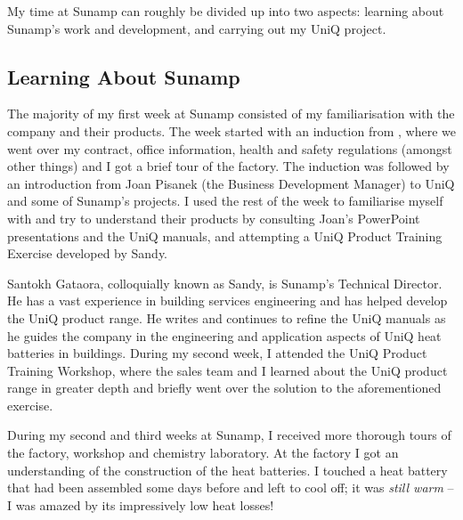 My time at Sunamp can roughly be divided up into two aspects: learning about Sunamp's work and development, and
carrying out my UniQ project.





\subsection{Learning About Sunamp}

The majority of my first week at Sunamp consisted of my familiarisation with the company and their products.
The week started with an induction from , where we went over my contract, office information, health and safety regulations (amongst other things) and I got a brief tour of the factory.
The induction was followed by an introduction from Joan Pisanek (the Business Development Manager) to UniQ and some of Sunamp's projects.
I used the rest of the week to familiarise myself with and try to understand their products by consulting Joan's PowerPoint presentations and the UniQ manuals,
and attempting a UniQ Product Training Exercise developed by Sandy.

Santokh Gataora, colloquially known as Sandy, is Sunamp's Technical Director.
He has a vast experience in building services engineering and has helped develop the UniQ product range.
He writes and continues to refine the UniQ manuals as he guides the company in the engineering and application aspects of UniQ heat batteries in buildings.
During my second week, I attended the UniQ Product Training Workshop, where the sales team and I learned about the UniQ product range in greater depth and briefly went over the solution to the aforementioned exercise.

During my second and third weeks at Sunamp, I received more thorough tours of the factory, workshop and chemistry laboratory.
At the factory I got an understanding of the construction of the heat batteries.
I touched a heat battery that had been assembled some days before and left to cool off; it was \emph{still warm} -- I was amazed by its impressively low heat losses!


